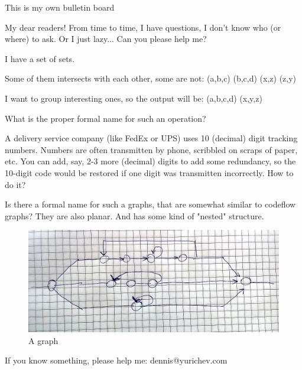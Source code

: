 
\begin{center}
\LARGE{} This is my own bulletin board \normalsize{}
\end{center}

My dear readers! From time to time, I have questions, I don't know who (or where) to ask.
Or I just lazy...
Can you please help me?

\myhrule{}

I have a set of sets.

Some of them intersects with each other, some are not: (a,b,c) (b,c,d) (x,z) (z,y)

I want to group interesting ones, so the output will be: (a,b,c,d) (x,y,z)

What is the proper formal name for such an operation?

\myhrule{}

A delivery service company (like FedEx or UPS) uses 10 (decimal) digit tracking numbers.
Numbers are often transmitten by phone, scribbled on scraps of paper, etc.
You can add, say, 2-3 more (decimal) digits to add some redundancy, so the 10-digit code would be restored
if one digit was transmitten incorrectly.
How to do it?

\myhrule{}

Is there a formal name for such a graphs, that are somewhat similar to codeflow graphs?
They are also planar.
And has some kind of "nested" structure.

\begin{figure}[H]
\centering
\includegraphics[width=\textwidth]{1st_page}
\caption{A graph}
\end{figure}

\myhrule{}

If you know something, please help me: dennis@yurichev.com

